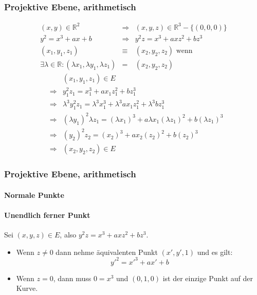 \documentclass{beamer}
\newcommand{\R}{\mathbb{R}}
\begin{document}
\begin{frame}
  \frametitle{Projektive Ebene, arithmetisch}
  \begin{eqnarray*}
    (x,y) \in \R^2
    & \Rightarrow & (x, y, z) \in \R^3 - \{(0,0,0)\} \\
    y^2 = x^3 + ax + b
    & \Rightarrow & y^2z = x^3 + axz^2 + bz^3 \\
    (x_1, y_1, z_1) &\equiv &(x_2, y_2, z_2) \text{ wenn } \\
    \exists \lambda \in \R:
    (\lambda x_1, \lambda y_1, \lambda z_1) & = & (x_2, y_2, z_2)
  \end{eqnarray*}
  \begin{eqnarray*}
     & & (x_1, y_1, z_1) \in E \\
     & \Rightarrow &
    y_1^2 z_1 = x_1^3 + a x_1 z_1^2 + b z_1^3 \\
    & \Rightarrow &
    \lambda^3 y_1^2 z_1
    = \lambda^3 x_1^3 + \lambda^3 a x_1 z_1^2 + \lambda^3 b z_1^3 \\
    & \Rightarrow &
    (\lambda y_1)^2 \lambda z_1 = (\lambda x_1)^3
    + a \lambda x_1 (\lambda z_1)^2 + b (\lambda z_1)^3 \\
    & \Rightarrow &
    (y_2)^2 z_2 = (x_2)^3
    + a x_2 (z_2)^2 + b (z_2)^3 \\
    & \Rightarrow & (x_2, y_2, z_2) \in E
  \end{eqnarray*}
\end{frame}

\begin{frame}
  \frametitle{Projektive Ebene, arithmetisch}
  \framesubtitle<1>{Normale Punkte}
  \framesubtitle<2>{Unendlich ferner Punkt}
  Sei $(x, y, z) \in E$, also $y^2z = x^3 + axz^2 + bz^3$.
  \begin{itemize}
  \item<1-> Wenn $z \ne 0$ dann nehme äquivalenten
    Punkt $(x', y', 1)$ und es gilt:
  \begin{equation*}
    {y'}^2 = {x'}^3 + ax' + b
  \end{equation*}
  \item<2> Wenn $z = 0$, dann muss $0 = x^3$ und $(0, 1, 0)$ ist der einzige
    Punkt auf der Kurve.
  \end{itemize}
\end{frame}
\end{document}

